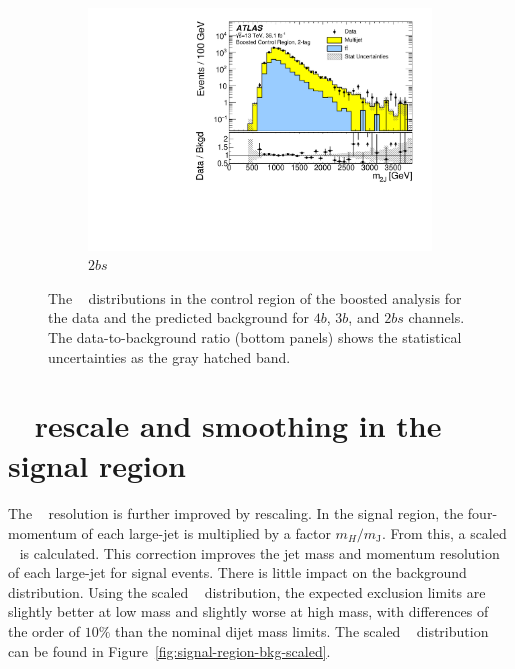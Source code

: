 \begin{figure}[htb!]
    \\
    \begin{subfigure}[b]{0.35\textwidth}
        \includegraphics[width=\textwidth,angle=-90]{figures/boosted/Paperplot/Moriond_bkg_9_TwoTag_split_Control_mHH_l_1.pdf}
        \caption{$2bs$}
        \label{fig:boosted-cr-mjj-2bs}
    \end{subfigure}
   \caption{The \mtwoJ~ distributions in the control region of the boosted analysis for the data and the predicted background for $4b$, $3b$, and $2bs$ channels. The data-to-background ratio (bottom panels) shows the statistical uncertainties as the gray hatched band.}
  \label{fig:boosted-cr-mjj}
\end{figure}


\section{\mtwoJ~ rescale and smoothing in the signal region}
\label{sec:boosted-SR-smoothing}

\paragraph{}
The \mtwoJ~ resolution is further improved by rescaling.
In the signal region, the four-momentum of each large-\R jet is multiplied by a factor $m_{H}/m_{\mathrm{J}}$.
From this, a scaled \mtwoJ~ is calculated.
This correction improves the jet mass and momentum resolution of each large-\R jet for signal events.
There is little impact on the background distribution.
Using the scaled \mtwoJ~ distribution, the expected exclusion limits are slightly better at low mass and slightly worse at high mass, with differences of the order of $10\%$ than the nominal dijet mass limits.
The scaled \mtwoJ~ distribution can be found in Figure~\ref{fig:signal-region-bkg-scaled}.


